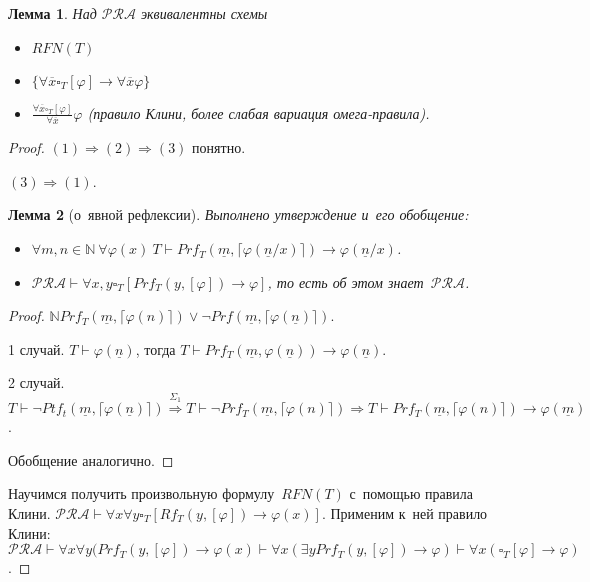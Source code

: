 \documentclass{article}
\newtheorem{lemma}{Лемма}
\theoremstyle{remark}
\renewcommand{\phi}{\varphi}
\begin{document}
\begin{lemma}
  Над $\mathcal{PRA}$ эквивалентны схемы
  \begin{itemize}
    \item $RFN(T)$
    \item $\{ \forall \overline{x} \square_T [\phi] \rightarrow \forall
      \overline{x} \phi\}$
    \item $\frac{\forall \overline{x} \square_T [\phi]}{\forall \overline{x}}
      \phi$ (правило Клини, более слабая вариация омега-правила).
  \end{itemize}
\end{lemma}
\begin{proof}
  $(1) \Rightarrow (2) \Rightarrow (3)$ понятно.

  $(3) \Rightarrow (1)$.
  \begin{lemma}[о~явной рефлексии]
    Выполнено утверждение и~его обобщение:
    \begin{itemize}
      \item $\forall m, n \in \mathbb{N}\ \forall \phi(x)\ T \vdash
        Prf_T(\underline{m}, \lceil \phi(\underline{n} / x) \rceil) \rightarrow
        \phi(\underline{n} / x)$.
      \item $\mathcal{PRA} \vdash \forall x, y \square_T[Prf_T(y, [\phi])
        \rightarrow \phi]$, то есть об этом знает~$\mathcal{PRA}$.
    \end{itemize}
  \end{lemma}
  \begin{proof}
    $\mathbb{N} Prf_T(\underline{m}, \lceil \phi(n) \rceil) \lor \neg
    Prf(\underline{m}, \lceil \phi(\underline{n}) \rceil)$.

    1 случай. $T \vdash \phi(\underline{n})$, тогда $T \vdash
    Prf_T(\underline{m}, \phi(\underline{n})) \rightarrow \phi(\underline{n})$.

    2 случай. $T \vdash \neg Ptf_t(\underline{m}, \lceil \phi(\underline{n})
    \rceil) \overset{\Sigma_1}\Rightarrow T \vdash \neg Prf_T(\underline{m},
    \lceil \phi(n) \rceil) \Rightarrow T \vdash Prf_T(\underline{m}, \lceil
    \phi(n) \rceil) \rightarrow \phi(\underline{m})$.

    Обобщение аналогично.
  \end{proof}

  Научимся получить произвольную формулу~$RFN(T)$ с~помощью правила Клини.
  $\mathcal{PRA} \vdash \forall x \forall y \square_T[Rf_T(y, [\phi])
  \rightarrow \phi(x)]$. Применим к~ней правило Клини:
  $\mathcal{PRA} \vdash \forall x \forall y (Prf_T(y, [\phi]) \rightarrow
  \phi(x) \vdash \forall x(\exists y Prf_T(y, [\phi]) \rightarrow \phi) \vdash
  \forall x(\square_T [\phi] \rightarrow \phi)$.
\end{proof}
\end{document}
